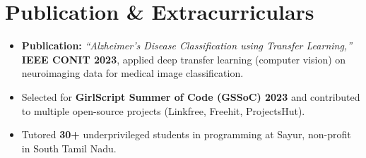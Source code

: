 \documentclass[letterpaper,10pt]{article}
\begin{document}
\section{Publication \& Extracurriculars}
\begin{itemize}[leftmargin=0.18in, itemsep=0pt, topsep=1pt]
  \item\small \textbf{Publication:} \textit{``Alzheimer's Disease Classification using Transfer Learning,''} \textbf{IEEE CONIT 2023}, applied deep transfer learning (computer vision) on neuroimaging data for medical image classification.
  \item\small Selected for \textbf{GirlScript Summer of Code (GSSoC) 2023} and contributed to multiple open-source projects (Linkfree, Freehit, ProjectsHut).
  \item\small Tutored \textbf{30+} underprivileged students in programming at Sayur, non-profit in South Tamil Nadu.
\end{itemize}
\vspace{-6pt}
\end{document}
